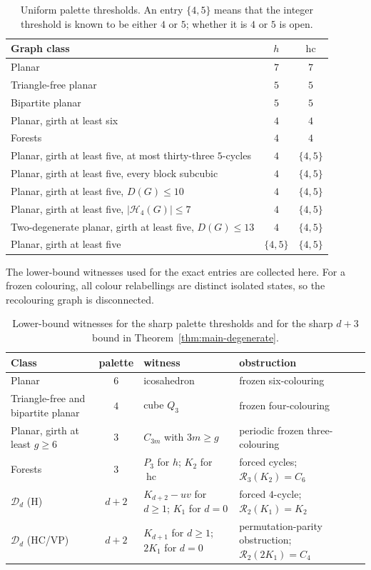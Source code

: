 \documentclass[11pt]{article}
\theoremstyle{remark}
\newcommand{\R}{\mathcal R}
\newcommand{\hc}{\operatorname{hc}}
\numberwithin{equation}{section}
\numberwithin{table}{section}
\begin{document}
\begin{table}[htbp]
\centering\small
\caption{Uniform palette thresholds.  An entry $\{4,5\}$ means that the
integer threshold is known to be either $4$ or $5$; whether it is $4$ or
$5$ is open.}
\label{tab:thresholds}
\begin{tabularx}{0.94\linewidth}{@{}Xcc@{}}
\toprule
Graph class & $h$ & $\hc$\\
\midrule
Planar & $7$ & $7$\\
Triangle-free planar & $5$ & $5$\\
Bipartite planar & $5$ & $5$\\
Planar, girth at least six & $4$ & $4$\\
Forests & $4$ & $4$\\
Planar, girth at least five, at most thirty-three $5$-cycles
  & $4$ & $\{4,5\}$\\
Planar, girth at least five, every block subcubic
  & $4$ & $\{4,5\}$\\
Planar, girth at least five, $D(G)\le10$
  & $4$ & $\{4,5\}$\\
Planar, girth at least five, $|\mathcal H_4(G)|\le7$
  & $4$ & $\{4,5\}$\\
Two-degenerate planar, girth at least five, $D(G)\le13$
  & $4$ & $\{4,5\}$\\
Planar, girth at least five
  & $\{4,5\}$ & $\{4,5\}$\\
\bottomrule
\end{tabularx}
\end{table}

The lower-bound witnesses used for the exact entries are collected here.
For a frozen colouring, all colour relabellings are distinct isolated
states, so the recolouring graph is disconnected.
\begin{table}[htbp]
\centering\small
\caption{Lower-bound witnesses for the sharp palette thresholds and for the
sharp $d+3$ bound in Theorem~\ref{thm:main-degenerate}.}
\label{tab:lower-witnesses}
\begin{tabularx}{0.94\linewidth}{@{}l c >{\raggedright\arraybackslash}X >{\raggedright\arraybackslash}X@{}}
\toprule
Class & palette & witness & obstruction\\
\midrule
Planar & $6$ & icosahedron & frozen six-colouring\\
Triangle-free and bipartite planar & $4$ & cube $Q_3$ & frozen four-colouring\\
Planar, girth at least $g\ge6$ & $3$ & $C_{3m}$ with $3m\ge g$
  & periodic frozen three-colouring\\
Forests & $3$ & $P_3$ for $h$; $K_2$ for $\hc$
  & forced cycles; $\R_3(K_2)=C_6$\\
$\mathcal D_d$ (H) & $d+2$ & $K_{d+2}-uv$ for $d\ge1$; $K_1$ for $d=0$
  & forced $4$-cycle; $\R_2(K_1)=K_2$\\
$\mathcal D_d$ (HC/VP) & $d+2$ & $K_{d+1}$ for $d\ge1$; $2K_1$ for $d=0$
  & permutation-parity obstruction; $\R_2(2K_1)=C_4$\\
\bottomrule
\end{tabularx}
\end{table}
\end{document}
